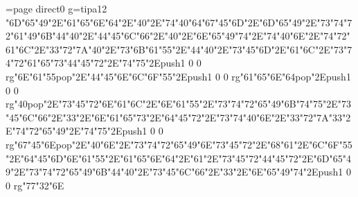\chardef\match=\pdfcolorstackinit page direct{0 g}\nopagenumbers\font\ipa=tipa12
\ipa\char"6D\ipa\char"65\ipa\char"49\ipa\char"2E\ipa\char"61\ipa\char"65\ipa\char"6E\ipa\char"64\ipa\char"2E\ipa\char"40\ipa\char"2E\ipa\char"74\ipa\char"40\ipa\char"64\medskip\ipa\char"67\ipa\char"45\ipa\char"6D\ipa\char"2E\ipa\char"6D\ipa\char"65\ipa\char"49\ipa\char"2E\ipa\char"73\ipa\char"74\ipa\char"72\ipa\char"61\ipa\char"49\ipa\char"6B\medskip\ipa\char"44\ipa\char"40\ipa\char"2E\ipa\char"44\ipa\char"45\ipa\char"6C\ipa\char"66\ipa\char"2E\ipa\char"40\ipa\char"2E\ipa\char"6E\ipa\char"65\ipa\char"49\ipa\char"74\ipa\char"2E\ipa\char"74\ipa\char"40\ipa\char"6E\ipa\char"2E\ipa\char"74\ipa\char"72\ipa\char"61\ipa\char"6C\ipa\char"2E\ipa\char"33\ipa\char"72\ipa\char"7A\medskip\ipa\char"40\ipa\char"2E\ipa\char"73\ipa\char"6B\ipa\char"61\ipa\char"55\ipa\char"2E\ipa\char"44\ipa\char"40\ipa\char"2E\ipa\char"73\ipa\char"45\ipa\char"6D\ipa\char"2E\ipa\char"61\ipa\char"6C\ipa\char"2E\ipa\char"73\ipa\char"74\ipa\char"72\ipa\char"61\ipa\char"65\ipa\char"73\medskip\ipa\char"44\ipa\char"45\ipa\char"72\ipa\char"2E\ipa\char"74\ipa\char"75\ipa\char"2E\pdfcolorstack\match push{1 0 0 rg}\ipa\char"6E\ipa\char"61\ipa\char"55\pdfcolorstack\match pop{}\ipa\char"2E\ipa\char"44\ipa\char"45\ipa\char"6E\medskip\vfill\eject\ipa\char"6C\ipa\char"6F\ipa\char"55\ipa\char"2E\pdfcolorstack\match push{1 0 0 rg}\ipa\char"61\ipa\char"65\ipa\char"6E\ipa\char"64\pdfcolorstack\match pop{}\ipa\char"2E\pdfcolorstack\match push{1 0 0 rg}\ipa\char"40\pdfcolorstack\match pop{}\ipa\char"2E\ipa\char"73\ipa\char"45\ipa\char"72\medskip\ipa\char"6E\ipa\char"61\ipa\char"6C\ipa\char"2E\ipa\char"6E\ipa\char"61\ipa\char"55\ipa\char"2E\ipa\char"73\ipa\char"74\ipa\char"72\ipa\char"65\ipa\char"49\ipa\char"6B\medskip\ipa\char"74\ipa\char"75\ipa\char"2E\ipa\char"73\ipa\char"45\ipa\char"6C\ipa\char"66\ipa\char"2E\ipa\char"33\ipa\char"2E\ipa\char"6E\ipa\char"61\ipa\char"65\ipa\char"73\ipa\char"2E\ipa\char"64\ipa\char"45\ipa\char"72\ipa\char"2E\ipa\char"73\ipa\char"74\ipa\char"40\ipa\char"6E\ipa\char"2E\ipa\char"33\ipa\char"72\ipa\char"7A\medskip\ipa\char"33\ipa\char"2E\ipa\char"74\ipa\char"72\ipa\char"65\ipa\char"49\ipa\char"2E\ipa\char"74\ipa\char"75\ipa\char"2E\pdfcolorstack\match push{1 0 0 rg}\ipa\char"67\ipa\char"45\ipa\char"6E\pdfcolorstack\match pop{}\ipa\char"2E\ipa\char"40\ipa\char"6E\ipa\char"2E\ipa\char"73\ipa\char"74\ipa\char"72\ipa\char"65\ipa\char"49\ipa\char"6E\medskip\ipa\char"73\ipa\char"45\ipa\char"72\ipa\char"2E\ipa\char"68\ipa\char"61\ipa\char"2E\ipa\char"6C\ipa\char"6F\ipa\char"55\ipa\char"2E\ipa\char"64\ipa\char"45\ipa\char"6D\medskip\vfill\eject\ipa\char"6E\ipa\char"61\ipa\char"55\ipa\char"2E\ipa\char"61\ipa\char"65\ipa\char"6E\ipa\char"64\ipa\char"2E\ipa\char"61\ipa\char"2E\ipa\char"73\ipa\char"45\ipa\char"72\medskip\ipa\char"44\ipa\char"45\ipa\char"72\ipa\char"2E\ipa\char"6D\ipa\char"65\ipa\char"49\ipa\char"2E\ipa\char"73\ipa\char"74\ipa\char"72\ipa\char"65\ipa\char"49\ipa\char"6B\medskip\ipa\char"44\ipa\char"40\ipa\char"2E\ipa\char"73\ipa\char"45\ipa\char"6C\ipa\char"66\ipa\char"2E\ipa\char"33\ipa\char"2E\ipa\char"6E\ipa\char"65\ipa\char"49\ipa\char"74\ipa\char"2E\pdfcolorstack\match push{1 0 0 rg}\ipa\char"77\ipa\char"32\ipa\char"6E\pdfcolorstack\match 